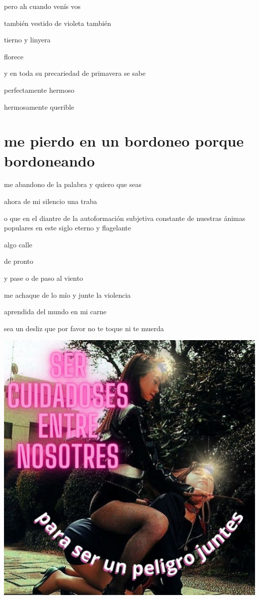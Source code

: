 \documentclass[
]{book}
\begin{document}
pero ah cuando venís vos

también vestido de violeta también

tierno y linyera

florece

y en toda su precariedad de primavera se sabe

perfectamente hermoso

hermosamente querible

\hypertarget{me-pierdo-en-un-bordoneo-porque-bordoneando}{%
\chapter{me pierdo en un bordoneo porque bordoneando}\label{me-pierdo-en-un-bordoneo-porque-bordoneando}}

me abandono de la palabra y quiero que seas

ahora de mi silencio una traba

o que en el diantre de la autoformación subjetiva constante de nuestras ánimas populares en este siglo eterno y flagelante

algo calle

de pronto

y pase o de paso al viento

me achaque de lo mío y junte la violencia

aprendida del mundo en mi carne

sea un desliz que por favor no te toque ni te muerda

\includegraphics{images/10.png}
\end{document}
